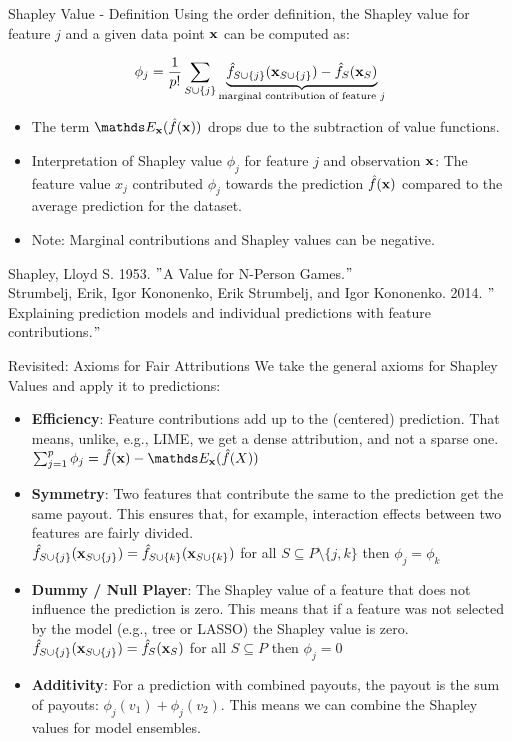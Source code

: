 \documentclass[11pt,compress,t,notes=noshow, aspectratio=169, xcolor=table]{beamer}
\begin{document}
\begin{vbframe}{Shapley Value - Definition}
  Using the order definition, the Shapley value for feature $j$ and a given data point $\xv$ can be computed as:

     $$ \phi_j  = \frac{1}{p!} \sum_{\Scupj} \underbrace{\fh_{\Scupj}(\xv_{\Scupj}) - \fh_{S}(\xv_{S})}_{\text{marginal contribution of feature $j$}} $$
\begin{itemize}
    \item The term $\E_{\xv}(\fh(\xv))$ drops due to the subtraction of value functions.
  \item Interpretation of Shapley value $\phi_j$ for feature $j$ and observation $\xv$:
  The feature value $x_j$ contributed $\phi_j$ towards the prediction $\fh(\xv)$ compared to the average prediction for the dataset.
   \item Note: Marginal contributions and Shapley values can be negative.
\end{itemize}
\lz
\tiny
Shapley, Lloyd S. 1953. $"$A Value for N-Person Games.$"$\\
\vspace{0.2cm}
Strumbelj, Erik, Igor Kononenko, Erik Strumbelj, and Igor Kononenko. 2014. $"$Explaining prediction models and individual predictions with feature contributions.$"$

\end{vbframe}



\begin{vbframe}{Revisited: Axioms for Fair Attributions}
  We take the general axioms for Shapley Values and apply it to predictions:
  \vspace{0.25cm}
  \begin{itemize}
  \itemsep1em
    \item \textbf{Efficiency}: Feature contributions add up to the (centered) prediction. That means, unlike, e.g., LIME, we get a dense attribution, and not a sparse one.
      $\sum\nolimits_{j=1}^p\phi_j=\fh(\xv)-\E_{\xv}(\fh(X))$
    \item \textbf{Symmetry}: Two features that contribute the same to the prediction get the same payout. This ensures that, for example, interaction effects between two features are fairly divided. \\
      $\fh_{S\cup\{j\}}(\xv_{\Scupj}) = \fh_{\Scupk}(\xv_{\Scupk})$ for all $S \subseteq P\setminus\{j,k\}$ then $\phi_j=\phi_k$
    \item \textbf{Dummy / Null Player}: The Shapley value of a feature that does not influence the prediction is zero. This means that if a feature was not selected by the model (e.g., tree or LASSO) the Shapley value is zero.  \\
      $\fh_{\Scupj}(\xv_{\Scupj})=\fhS(\xv_S)$ for all $S \subseteq P$ then $\phi_j=0$
    \item \textbf{Additivity}:  For a prediction with combined payouts, the
      payout is the sum of payouts: $\phi_j(v_1) + \phi_j(v_2)$. This means we can combine the Shapley values for model ensembles.
  \end{itemize}
\end{vbframe}
\end{document}
